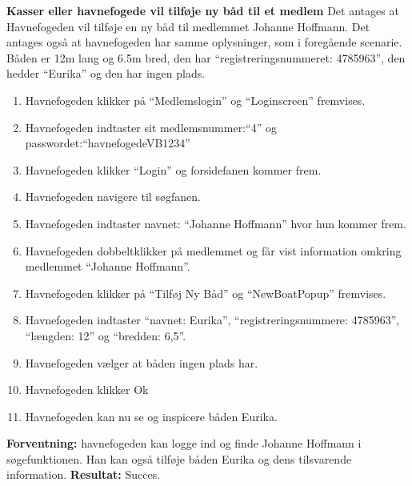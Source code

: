 \textbf{Kasser eller havnefogede vil tilføje ny båd til et medlem}
Det antages at Havnefogeden vil tilføje en ny båd til medlemmet Johanne Hoffmann. Det antages også at havnefogeden har samme oplysninger, som i foregående scenarie. Båden er 12m lang og 6.5m bred, den har \enquote{registreringsnummeret: 4785963}, den hedder \enquote{Eurika} og den har ingen plads.
\begin{enumerate}
	\item Havnefogeden klikker på \enquote{Medlemslogin} og \enquote{Loginscreen} fremvises.
	\item Havnefogeden indtaster sit medlemsnummer:\enquote{4} og passwordet:\enquote{havnefogedeVB1234}
	\item Havnefogeden klikker \enquote{Login} og forsidefanen kommer frem.
	\item Havnefogeden navigere til søgfanen.
	\item Havnefogeden indtaster navnet: \enquote{Johanne Hoffmann} hvor hun kommer frem.
	\item Havnefogeden dobbeltklikker på medlemmet og får vist information omkring medlemmet \enquote{Johanne Hoffmann}.
	\item Havnefogeden klikker på \enquote{Tilføj Ny Båd} og \enquote{NewBoatPopup} fremvises.
	\item Havnefogeden indtaster \enquote{navnet: Eurika}, \enquote{registreringsnummere: 4785963}, \enquote{længden: 12} og \enquote{bredden: 6,5}.
	\item Havnefogeden vælger at båden ingen plads har.
	\item Havnefogeden klikker Ok
	\item Havnefogeden kan nu se og inspicere båden Eurika.
\end{enumerate}

\textbf{Forventning:} havnefogeden kan logge ind og finde Johanne Hoffmann i søgefunktionen. Han kan også tilføje båden Eurika og dens  tilsvarende information.
\textbf{Resultat:} Succes.



